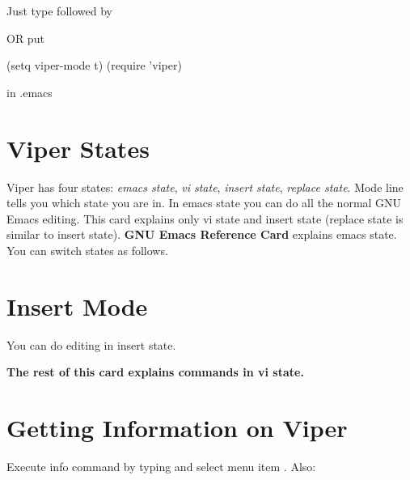 Just type  followed by 

OR put

(setq viper-mode t)
(require 'viper)

in .emacs

\section{Viper States}

Viper has four states: {\it emacs state}, {\it vi state}, {\it insert state},
{\it replace state}.
Mode line tells you which state you are in.
In emacs state you can do all the normal GNU Emacs editing.
This card explains only vi state and insert state (replace state is similar
to insert state).
{\bf GNU Emacs Reference Card} explains emacs state.
You can switch states as follows.



\section{Insert Mode}
You can do editing in insert state.


\vskip 2mm

{\bf The rest of this card explains commands in {\bf vi state}.}

\section{Getting Information on Viper}

Execute info command by typing  and select menu item
.  Also:


